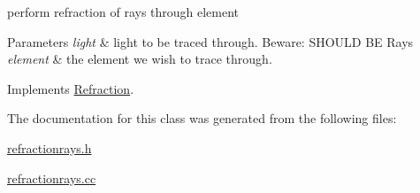 perform refraction of rays through element 


\begin{DoxyParams}{Parameters}
{\em light} & light to be traced through. Beware\+: S\+H\+O\+U\+LD BE Rays \\
\hline
{\em element} & the element we wish to trace through. \\
\hline
\end{DoxyParams}


Implements \hyperlink{classRefraction}{Refraction}.



The documentation for this class was generated from the following files\+:\begin{DoxyCompactItemize}
\item 
\hyperlink{refractionrays_8h}{refractionrays.\+h}\item 
\hyperlink{refractionrays_8cc}{refractionrays.\+cc}\end{DoxyCompactItemize}

